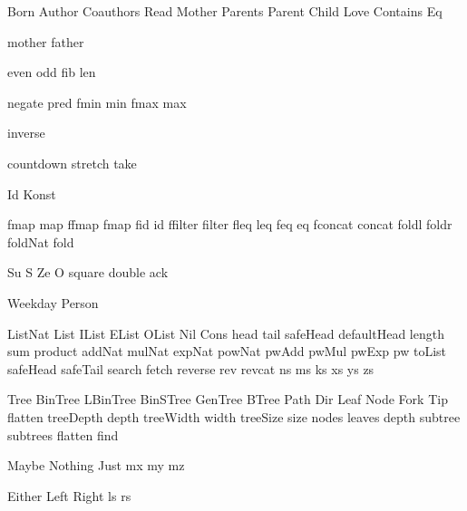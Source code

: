 
\DefRel Born
\DefRel Author
\DefRel Coauthors
\DefRel Read
\DefRel Mother
\DefRel Parents
\DefRel Parent
\DefRel Child
\DefRel Love
\DefRel Contains
\DefRel Eq

\DefFun mother
\DefFun father

\DefFun even
\DefFun odd
\DefFun fib
\DefFun len

\DefFpf negate
\DefFpf pred
\DefFPF fmin   min
\DefFPF fmax   max

\DefFpf inverse

\DefFpf countdown
\DefFpf stretch
\DefFpf take

\DefType Id
\DefType Konst

\DefFPF fmap     map
\DefFPF ffmap    fmap
\DefFPF fid      id
\DefFPF ffilter  filter
\DefFPF fleq     leq
\DefFPF feq      eq
\DefFPF fconcat  concat
\DefFpf foldl
\DefFpf foldr
\DefFpf foldNat
\DefFpf fold

\DefCONS Su S
\DefCONS Ze O
\DefFpf  square
\DefFpf  double
\DefFpf  ack

\DefType Weekday
\DefType Person

\DefType ListNat
\DefType List
\DefType IList
\DefType EList
\DefType OList
\DefCons Nil
\DefCons Cons
\DefFpf  head
\DefFpf  tail
\DefFpf  safeHead
\DefFpf  defaultHead
\DefFpf  length
\DefFpf  sum
\DefFpf  product
\DefFpf  addNat
\DefFpf  mulNat
\DefFpf  expNat
\DefFpf  powNat
\DefFpf  pwAdd
\DefFpf  pwMul
\DefFpf  pwExp
\DefFpf  pw
\DefFpf  toList
\DefFpf  safeHead
\DefFpf  safeTail
\DefFpf  search
\DefFpf  fetch
\DefFpf  reverse
\DefFpf  rev
\DefFpf  revcat
\DefVar  ns
\DefVar  ms
\DefVar  ks
\DefVar  xs
\DefVar  ys
\DefVar  zs

\DefType Tree
\DefType BinTree
\DefType LBinTree
\DefType BinSTree
\DefType GenTree
\DefType BTree
\DefType Path
\DefType Dir
\DefCons Leaf
\DefCons Node
\DefCons Fork
\DefCons Tip
\DefFpf  flatten
\DefFPF  treeDepth  depth
\DefFPF  treeWidth  width
\DefFPF  treeSize   size
\DefFpf  nodes
\DefFpf  leaves
\DefFpf  depth
\DefFpf  subtree
\DefFpf  subtrees
\DefFpf  flatten
\DefFpf  find


\DefType Maybe
\DefCons Nothing
\DefCons Just
\DefVar  mx
\DefVar  my
\DefVar  mz

\DefType Either
\DefCons Left
\DefCons Right
\DefVar  ls
\DefVar  rs

\def\bla{\mathrm{bla}}
\def\blu{\mathrm{blu}}

\def\persons{{\cal P}}
\let\pers=\persons

\def\euclid{\algorithmstylize{Euclid}}%

\def\Smile{\rel{\woohoo}}
\def\Frown{\rel{\boohoo}}

\def\oddAs#1{A_{[#1]}}


